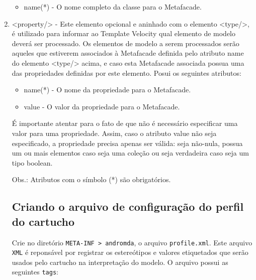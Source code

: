 \begin{enumerate}
\begin{itemize}
  \item name(*) - O nome completo da classe para o Metafacade.
\end{itemize}

\item <property/> - Este elemento opcional e aninhado com o elemento <type/>, é
utilizado para informar ao Template Velocity qual elemento de modelo deverá ser
processado. Os elementos de modelo a serem processados serão aqueles que
estiverem associados à Metafacade definida pelo atributo name do elemento
<type/> acima, e caso esta Metafacade associada possua uma das propriedades
definidas por este elemento. Posui os seguintes atributos:

\begin{itemize}
  \item name(*) - O nome da propriedade para o Metafacade.
  \item value - O valor da propriedade para o Metafacade.
\end{itemize}

É importante atentar para o fato de que não é necessário especificar uma valor
para uma propriedade. Assim, caso o atributo value não seja especificado, a
propriedade precisa apenas ser válida: seja não-nula, possua um ou mais
elementos caso seja uma coleção ou seja verdadeira caso seja um tipo boolean.

Obs.: Atributos com o símbolo (*) são obrigatórios.

\subsection{Criando o arquivo de configuração do perfil do cartucho}
Crie no diretório \texttt{META-INF > andromda}, o arquivo \texttt{profile.xml}.
Este arquivo \texttt{XML} é reponsável por registrar os estereótipos e valores
etiquetados que serão usados pelo cartucho na interpretação do modelo. O arquivo
possui as seguintes \texttt{tags}:


\end{enumerate}
